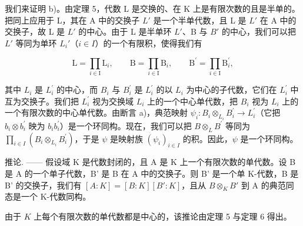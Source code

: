 我们来证明 b)。由定理 5，代数 L 是交换的、在 K 上是有限次数的且是半单的。把同上应用于 L，其在 A 中的交换子 \(L'\) 是一个半单代数，且 L 是 \(L'\) 在 A 中的交换子，故 L 是 \(L'\) 的中心。由于 L 是半单环 \(L'\)、B 与 \(B'\) 的中心，我们可以把 \(L'\) 等同为单环 \(L_{i}'\)（\(i \in I\)）的一个有限积，使得我们有

\[
\mathrm{L} = \prod_ {i \in \mathrm{I}} \mathrm{L} _ {i}, \qquad \mathrm{B} = \prod_ {i \in \mathrm{I}} \mathrm{B} _ {i}, \qquad \mathrm{B} ^ {\prime} = \prod_ {i \in \mathrm{I}} \mathrm{B} _ {i} ^ {\prime},
\]

其中 \(L_{i}\) 是 \(L_{i}^{\prime}\) 的中心，而 \(B_{i}\) 与 \(B_{i}^{\prime}\) 是 \(L_{i}^{\prime}\) 的以 \(L_{i}\) 为中心的子代数，它们在 \(L_{i}^{\prime}\) 中互为交换子。我们把 \(L_{i}^{\prime}\) 视为交换域 \(L_{i}\) 上的一个中心单代数，把 \(B_{i}\) 视为 \(L_{i}\) 上的一个有限次数的中心单代数。由断言 a)，典范映射 \(\psi_{i}: B_{i} \otimes_{L_{i}} B_{i}^{\prime} \to L_{i}^{\prime}\)（它把 \(b_{i} \otimes b_{i}^{\prime}\) 映为 \(b_{i}b_{i}^{\prime}\)）是一个环同构。现在，我们可以把 \(B \otimes_{L} B^{\prime}\) 等同为 \(\prod_{i \in I}(B_{i} \otimes_{L_{i}} B_{i}^{\prime})\)，于是 \(\psi\) 是映射族 \((\psi_{i})_{i \in I}\) 的积。因此，\(\psi\) 是一个环同构。

推论. —— 假设域 K 是代数封闭的，且 A 是 K 上一个有限次数的单代数。设 B 是 A 的一个单子代数，B' 是 B 在 A 中的交换子。则 B' 是一个单 K-代数，B 是 B' 的交换子，我们有 \([A:K]=[B:K][B':K]\)，且从 \(B\otimes_{K}B'\) 到 A 的典范同态是一个 K-代数同构。

由于 \(K\) 上每个有限次数的单代数都是中心的，该推论由定理 5 与定理 6 得出。

